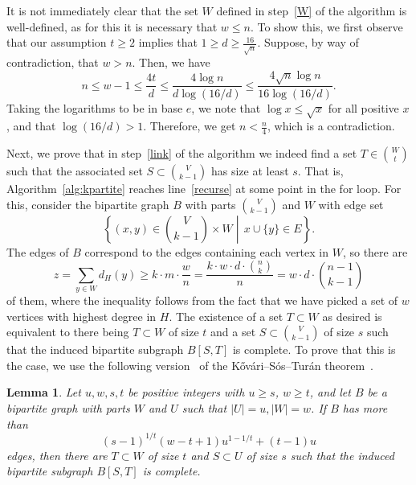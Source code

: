 \documentclass{amsart}
\newtheorem{lemma}[subsection]{Lemma}
\begin{document}
    It is not immediately clear that the set $W$ defined in step~\ref{W} of the algorithm
    is well-defined, as for this it is necessary that $w \leq n$.
    To show this, we first observe that our assumption $t \geq 2$
    implies that $ 1 \geq d \geq \frac{16}{\sqrt{n}}$.
    Suppose, by way of contradiction, that $w > n$.
    Then, we have
    \[
        n \leq w - 1 \leq \frac{4t}{d} \leq \frac{4\log n}{d\log(16/d)} \leq \frac{4 \sqrt{n} \log n }{16 \log(16/d)}.
    \]
    Taking the logarithms to be in base $e$, we note that $\log x \leq \sqrt{x}$ for all positive $x$,
    and that $\log(16/d) > 1$.
    Therefore, we get $n < \frac{n}{4}$, which is a contradiction.

    Next, we prove that in step~\ref{link} of the algorithm
    we indeed find a set $T \in \binom{W}{t}$ such that the associated set
    $S \subset \binom{V}{k-1}$ has size at least $s$.
    That is, Algorithm~\ref{alg:kpartite} reaches line~\ref{recurse} at some point in the for loop.
    For this, consider the bipartite graph $B$ with parts $\binom{V}{k-1}$ and $W$ with edge set
    \[
      \left\{(x, y) \in \binom{V}{k-1} \times W \middle| \, x \cup \{y\} \in E\right\}.
    \]
    The edges of $B$ correspond to the edges containing each vertex in $W$, so there are
    \[
        z = \sum_{y \in W} d_H(y) \geq k \cdot m \cdot \frac{w}{n} = \frac{k \cdot w \cdot d \cdot \binom{n}{k}}{n} = w \cdot d \cdot \binom{n - 1}{k-1}
    \]
    of them, where the inequality follows from the fact that we have picked a set of $w$ vertices with highest degree in $H$.
    The existence of a set $T \subset W$ as desired is equivalent to there being $T \subset W$ of size $t$ and a set $S \subset \binom{V}{k-1}$ of size $s$
    such that the induced bipartite subgraph $B[S, T]$ is complete.
    To prove that this is the case,
    we use the following version~\cite{Hylten1958} of the K\H{o}v\'{a}ri–S\'{o}s–Tur\'{a}n theorem~\cite{Kovari1954}.

    \begin{lemma}\label{thm:kst}
        Let $u, w, s, t$ be positive integers with $u \geq s$, $w \geq t$, and let $B$ be a bipartite graph with parts $W$ and $U$ such that
        $|U| = u, |W| = w$.
        If $B$ has more than \[(s - 1)^{1 / t}(w - t + 1)u^{1 - 1 / t} + (t - 1)u\] edges, then there are
        $T \subset W$ of size $t$ and $S \subset U$ of size $s$ such that the induced bipartite subgraph $B[S, T]$ is complete.
    \end{lemma}
\end{document}
